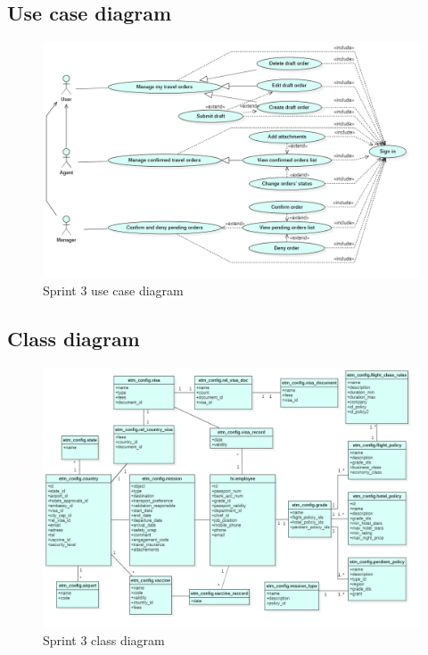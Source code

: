          \subsection{Use case diagram}
    \begin{figure}[H]
    \begin{center}
        \includegraphics[scale=0.5]{img/sprint3_usecase.png}
        \caption{Sprint 3 use case diagram}
    \end{center}
     \label{fig:my_label}
\end{figure}
         \subsection{Class diagram}
    \begin{figure}[H]
    \begin{center}
        \includegraphics[scale=0.450]{img/sprint3_class.png}
        \caption{Sprint 3 class diagram}
    \end{center}
     \label{fig:my_label}
\end{figure}


